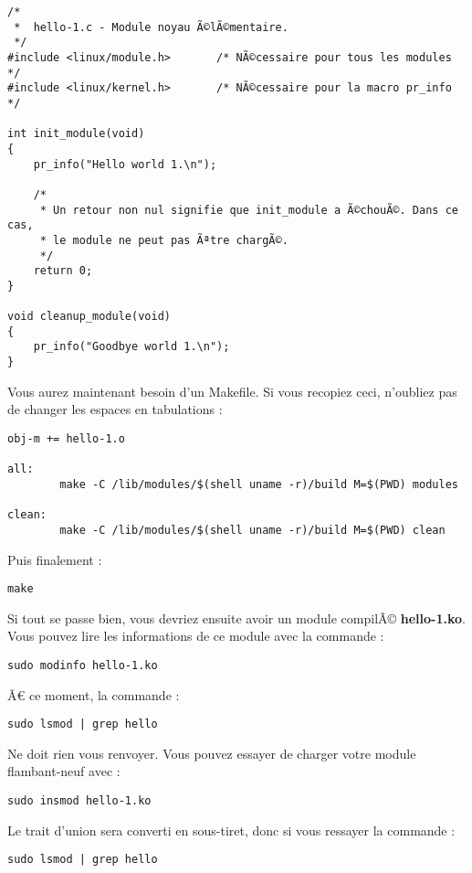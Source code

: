 \documentclass[11pt]{article}
\begin{document}
\begin{verbatim}
/*
 *  hello-1.c - Module noyau Ã©lÃ©mentaire.
 */
#include <linux/module.h>       /* NÃ©cessaire pour tous les modules */
#include <linux/kernel.h>       /* NÃ©cessaire pour la macro pr_info */

int init_module(void)
{
    pr_info("Hello world 1.\n");

    /*
     * Un retour non nul signifie que init_module a Ã©chouÃ©. Dans ce cas,
     * le module ne peut pas Ãªtre chargÃ©.
     */
    return 0;
}

void cleanup_module(void)
{
    pr_info("Goodbye world 1.\n");
}
\end{verbatim}

Vous aurez maintenant besoin d'un Makefile. Si vous recopiez ceci, n'oubliez pas de changer les espaces en tabulations :

\begin{verbatim}
obj-m += hello-1.o

all:
        make -C /lib/modules/$(shell uname -r)/build M=$(PWD) modules

clean:
        make -C /lib/modules/$(shell uname -r)/build M=$(PWD) clean
\end{verbatim}

Puis finalement :

\begin{verbatim}
make
\end{verbatim}

Si tout se passe bien, vous devriez ensuite avoir un module compilÃ© \textbf{hello-1.ko}. Vous pouvez lire les informations de ce module avec la commande :

\begin{verbatim}
sudo modinfo hello-1.ko
\end{verbatim}

Ã€ ce moment, la commande :

\begin{verbatim}
sudo lsmod | grep hello
\end{verbatim}

Ne doit rien vous renvoyer. Vous pouvez essayer de charger votre module flambant-neuf avec :

\begin{verbatim}
sudo insmod hello-1.ko
\end{verbatim}

Le trait d'union sera converti en sous-tiret, donc si vous ressayer la commande :

\begin{verbatim}
sudo lsmod | grep hello
\end{verbatim}
\end{document}
